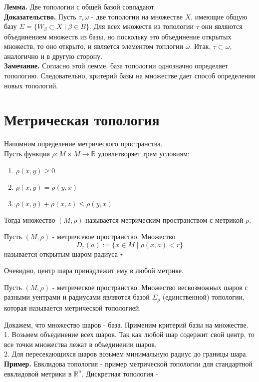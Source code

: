 \textbf{Лемма.} Две топологии с общей базой совпадают.\\
\textbf{Доказательство.} Пусть $\tau,\omega$ - две топологии на множестве 
$X$,  имеющие общую базу $\Sigma=\{W_\beta\subset X\mid\beta\in B\} $. 
Для всех множеств из топологии $\tau$  они являются объединением множеств из
базы, но поскольку это объединение открытых множеств, то оно открыто, и 
является элементом топлогии $\omega$. Итак,  $\tau\subset \omega$, аналогично
и в другую сторону. \\
\textbf{Замечание.} Согласно этой лемме, база топологии однозначно определяет
топологию. Следовательно, критерий базы на множестве дает способ 
определения новых топологий. 
\section{Метрическая топология}
Напомним определение метрического пространства. \\
Пусть функция $\rho\colon M\times M\to\mathbb{R}$ удовлетворяет трем условиям:
\begin{enumerate}
    \item $\rho(x,y)\geqslant 0$
    \item $\rho(x,y)=\rho(y,x)$
    \item  $\rho(x,y)+\rho(x,z)\leqslant \rho(y,x)$
\end{enumerate}
Тогда множество $(M,\rho)$ называется метрическим пространством с метрикой  
$\rho$.
\begin{defin}
Пусть  $(M,\rho)$ - метричсекое пространство. Множество
$$D_r(a):=\{x\in M\mid\rho(x,a)<r\}$$ 
называется открытым шаром радиуса $r$ 
\end{defin}
Очевидно, центр шара принадлежит ему в любой метрике. 
\begin{defin}
Пусть $(M,\rho)$ - метрическое пространство. Множество весвозможных шаров
с разными уентрами и радиусами являются базой $\Sigma_\rho$ (единственной)
топологии,
которая называется метрической топологией. 
\end{defin}
Докажем, что множество шаров - база. Применим критерий базы на множестве.\\
1. Возьмем объединение всех шаров. Так как любой шар содержит свой центр,
то все точки множества лежат в объединении шаров. \\
2. Для пересекающихся шаров возьмем минимальную радиус до границы шара. \\
\textbf{Пример.} Евклидова топология - пример метрической топологии для
стандартной евклидовой метрики в $\mathbb{R}^n$.  Дискретная топология - 
